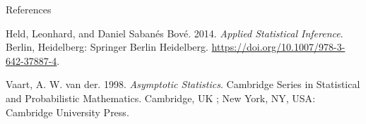 \documentclass[
  8pt,
  ignorenonframetext,
]{beamer}
\newlength{\cslhangindent}
\newlength{\cslentryspacingunit} %
\newenvironment{CSLReferences}[2] %
 {%
  \setlength{\parindent}{0pt}
  \ifodd #1
  \let\oldpar\par
  \def\par{\hangindent=\cslhangindent\oldpar}
  \fi
  \setlength{\parskip}{#2\cslentryspacingunit}
 }%
 {}
\begin{document}
\begin{frame}{References}
\protect\hypertarget{references}{}
\footnotesize

\hypertarget{refs}{}
\begin{CSLReferences}{1}{0}
\leavevmode{}%
Held, Leonhard, and Daniel Sabanés Bové. 2014. \emph{Applied
{Statistical Inference}}. {Berlin, Heidelberg}: {Springer Berlin
Heidelberg}. \url{https://doi.org/10.1007/978-3-642-37887-4}.

\leavevmode{}%
Vaart, A. W. van der. 1998. \emph{Asymptotic Statistics}. Cambridge
Series in Statistical and Probabilistic Mathematics. {Cambridge, UK ;
New York, NY, USA}: {Cambridge University Press}.

\end{CSLReferences}
\end{frame}
\end{document}
